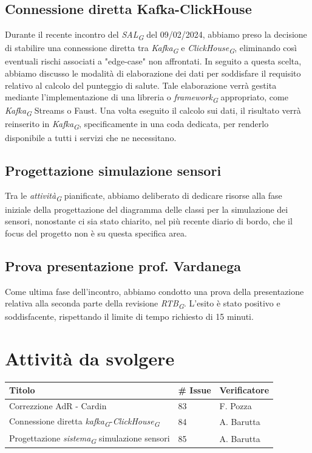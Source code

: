 \documentclass{article}
\begin{document}
\subsection{Connessione diretta Kafka-ClickHouse}
Durante il recente incontro del \textit{SAL}\textsubscript{\textit{G}} del 09/02/2024, abbiamo preso la decisione di stabilire una connessione diretta tra \textit{Kafka}\textsubscript{\textit{G}} e \textit{ClickHouse}\textsubscript{\textit{G}}, eliminando così eventuali rischi associati a "edge-case" non affrontati. In seguito a questa scelta, abbiamo discusso le modalità di elaborazione dei dati per soddisfare il requisito relativo al calcolo del punteggio di salute. Tale elaborazione verrà gestita mediante l'implementazione di una libreria o \textit{framework}\textsubscript{\textit{G}} appropriato, come \textit{Kafka}\textsubscript{\textit{G}} Streams o Faust. Una volta eseguito il calcolo sui dati, il risultato verrà reinserito in \textit{Kafka}\textsubscript{\textit{G}}, specificamente in una coda dedicata, per renderlo disponibile a tutti i servizi che ne necessitano.

\subsection{Progettazione simulazione sensori}
Tra le \textit{attività}\textsubscript{\textit{G}} pianificate, abbiamo deliberato di dedicare risorse alla fase iniziale della progettazione del diagramma delle classi per la simulazione dei sensori, nonostante ci sia stato chiarito, nel più recente diario di bordo, che il focus del progetto non è su questa specifica area.

\subsection{Prova presentazione prof. Vardanega}
Come ultima fase dell'incontro, abbiamo condotto una prova della presentazione relativa alla seconda parte della revisione \textit{RTB}\textsubscript{\textit{G}}.
L'esito è stato positivo e soddisfacente, rispettando il limite di tempo richiesto di 15 minuti.

\section{Attività da svolgere}
    \begin{center}
        \begin{tabular}{|C{7cm}|C{1,5cm}|C{3cm}|}
            \hline
            \textbf{Titolo} & \textbf{\# Issue} & \textbf{Verificatore} \\
            \hline\hline
            Correzzione AdR - Cardin & 83 & F. Pozza \\
            \hline
            Connessione diretta \textit{kafka}\textsubscript{\textit{G}}-\textit{ClickHouse}\textsubscript{\textit{G}} & 84 & A. Barutta \\
            \hline
            Progettazione \textit{sistema}\textsubscript{\textit{G}} simulazione sensori & 85 & A. Barutta \\
            \hline
        \end{tabular}
    \end{center}
\end{document}
